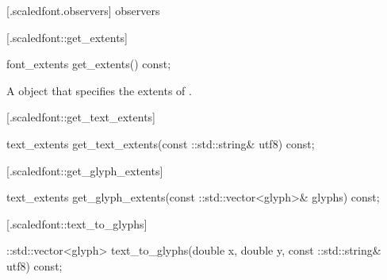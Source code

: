  [\iotwod.scaledfont.observers] { observers}

 [\iotwod.scaledfont::get_extents] {}

%
%
\begin{itemdecl}
font_extents get_extents() const;
\end{itemdecl}
\begin{itemdescr}
	\pnum
	\returns
	A  object that specifies the extents of .
\end{itemdescr}

 [\iotwod.scaledfont::get_text_extents] 
{}

%
%
\begin{itemdecl}
text_extents get_text_extents(const ::std::string& utf8) const;
\end{itemdecl}
\begin{itemdescr}
	\pnum
	\effects
	
	\pnum
	\returns
	
\end{itemdescr}

 [\iotwod.scaledfont::get_glyph_extents] 
{}

%
%
\begin{itemdecl}
text_extents get_glyph_extents(const ::std::vector<glyph>& glyphs) const;
\end{itemdecl}
\begin{itemdescr}
	\pnum
	\effects
	
	\pnum
	\returns
	
\end{itemdescr}

 [\iotwod.scaledfont::text_to_glyphs] 
{}

%
%
\begin{itemdecl}
::std::vector<glyph> text_to_glyphs(double x, double y, const 
      ::std::string& utf8) const;
\end{itemdecl}
\begin{itemdescr}
	\pnum
	\effects
	
	\pnum
	\returns
	
\end{itemdescr}

